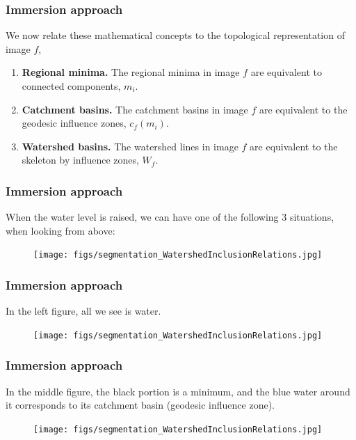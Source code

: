 \begin{frame}
\frametitle{Immersion approach}
\logoCSIPCPL\mypagenum
	We now relate these mathematical concepts to the topological
	representation of image $f$,	
	\begin{enumerate}
		\item \textbf{Regional minima.}  The regional minima in image $f$ are equivalent to connected components, $m_i$.
		\item \textbf{Catchment basins.}  The catchment basins in image $f$ are equivalent to the geodesic influence zones, $c_f(m_i)$.
		\item \textbf{Watershed basins.}  The watershed lines in image $f$ are equivalent to the skeleton by influence zones, $W_f$.
	\end{enumerate}
\end{frame}





\begin{frame}
\frametitle{Immersion approach}
\logoCSIPCPL\mypagenum
	When the water level is raised, we can have one of the following 3 situations, when looking from above:
	\begin{figure}[!htp]
		\texttt{[image: figs/segmentation\_WatershedInclusionRelations.jpg]}
	\end{figure}
\end{frame}





\begin{frame}
\frametitle{Immersion approach}
\logoCSIPCPL\mypagenum
	In the left figure, all we see is water.
	\begin{figure}[!htp]
		\texttt{[image: figs/segmentation\_WatershedInclusionRelations.jpg]}
	\end{figure}
\end{frame}





\begin{frame}
\frametitle{Immersion approach}
\logoCSIPCPL\mypagenum
	In the middle figure, the black portion is a minimum, and the blue water around it corresponds to its catchment basin (geodesic	influence zone).
	\begin{figure}[!htp]
		\texttt{[image: figs/segmentation\_WatershedInclusionRelations.jpg]}
	\end{figure}
\end{frame}





